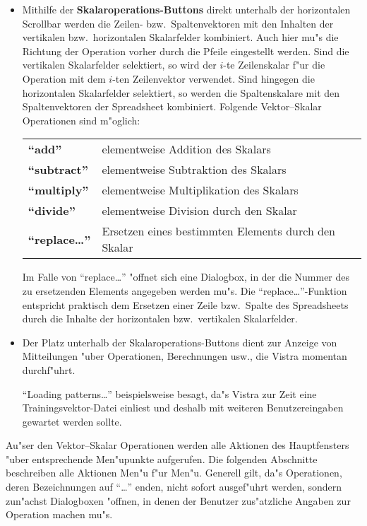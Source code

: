 \begin{itemize}
\item Mithilfe der {\bf Skalaroperations-Buttons} direkt unterhalb der 
horizontalen Scrollbar
werden die Zeilen- bzw.~Spaltenvektoren mit den Inhalten der vertikalen
bzw.~horizontalen Skalarfelder kombiniert.
Auch hier mu"s die Richtung der Operation vorher durch die Pfeile
eingestellt werden.
Sind die vertikalen Skalarfelder selektiert, so wird der $i$-te 
Zeilenskalar f"ur die Operation mit dem $i$-ten Zeilenvektor 
verwendet.
Sind hingegen die horizontalen Skalarfelder selektiert, so werden die
Spaltenskalare mit den Spaltenvektoren der Spreadsheet kombiniert.  
Folgende Vektor--Skalar Operationen sind m"oglich: 

\begin{tabular}{ll}
{\bf "`add"'} & elementweise Addition des Skalars \\
{\bf "`subtract"'} & elementweise Subtraktion des Skalars \\
{\bf "`multiply"'} & elementweise Multiplikation des Skalars \\
{\bf "`divide"'} & elementweise Division durch den Skalar \\
{\bf "`replace\ldots"'} & Ersetzen eines bestimmten Elements durch den Skalar \\
\end{tabular}

Im Falle von "`replace\ldots"' "offnet sich eine Dialogbox, in der
die Nummer des zu ersetzenden Elements angegeben werden mu"s.
Die "`replace\ldots"'-Funktion entspricht praktisch dem Ersetzen
einer Zeile bzw.~Spalte des Spreadsheets durch die Inhalte der horizontalen
bzw.~vertikalen Skalarfelder.

\item Der Platz unterhalb der Skalaroperations-Buttons dient zur
Anzeige von Mitteilungen "uber Operationen, Berechnungen usw., die
Vistra momentan durchf"uhrt.

"`Loading patterns\ldots"' beispielsweise besagt,
da"s Vistra zur Zeit eine Trainingsvektor-Datei einliest und deshalb
mit weiteren Benutzereingaben gewartet werden sollte.
\end{itemize}

Au"ser den Vektor--Skalar Operationen werden alle Aktionen des Hauptfensters
"uber entsprechende Men"upunkte aufgerufen.
Die folgenden Abschnitte beschreiben alle Aktionen Men"u f"ur Men"u. 
Generell gilt, da"s Operationen, deren Bezeichnungen auf "`\ldots"' enden, 
nicht sofort ausgef"uhrt werden, sondern zun"achst Dialogboxen "offnen,
in denen der Benutzer zus"atzliche Angaben zur Operation machen mu"s.  

